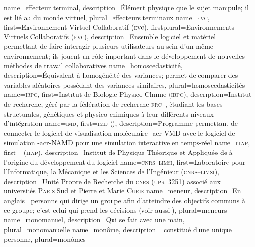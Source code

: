 %
{%
	name={effecteur terminal},%
	description={Élément physique que le sujet manipule; il est lié au  du monde virtuel},%
	plural={effecteurs terminaux}%
}
%
{%
	name={\textsc{evc}},%
	first={Environnement Virtuel Collaboratif (\textsc{evc})},%
	firstplural={Environnements Virtuels Collaboratifs (\textsc{evc})},%
	description={Ensemble logiciel et matériel permettant de faire interagir plusieurs utilisateurs au sein d'un même environnement; ils jouent un rôle important dans le développement de nouvelles méthodes de travail collaboratives}%
}
%
{%
	name={homoscedasticité},%
	description={Équivalent à homogénéité des variances; permet de comparer des variables aléatoires possédant des variances similaires},%
	plural={homoscedasticités}%
}
%
{%
	name={\textsc{ibpc}},%
	first={Institut de Biologie Physico-Chimie (\textsc{ibpc})},%
	description={Institut de recherche, géré par la fédération de recherche \textsc{frc}~, étudiant les bases structurales, génétiques et physico-chimiques à leur différents niveaux d'intégration}%
}
%
{%
	name={\textsc{imd}},%
	first={\textsc{imd} ()},%
	description={Programme permettant de connecter le logiciel de visualisation moléculaire \myacro-{acr-VMD} avec le logiciel de simulation \myacro-{acr-NAMD} pour une simulation interactive en temps-réel }%
}
%
{%
	name={\textsc{itap}},%
	first={ (\textsc{itap})},%
	description={Institut de Physique Théorique et Appliquée de  à l'origine du développement du logiciel }%
}
%
{%
	name={\textsc{cnrs--limsi}},%
	first={Laboratoire pour l'Informatique, la Mécanique et les Sciences de l'Ingénieur (\textsc{cnrs--limsi})},%
	description={Unité Propre de Recherche du \textsc{cnrs} (\textsc{upr}~3251) associé aux universités \textsc{Paris} Sud et Pierre et Marie \textsc{Curie}}%
}
%
{%
	name={meneur},%
	description={En anglais , personne qui dirige un groupe afin d'atteindre des objectifs communs à ce groupe; c'est celui qui prend les décisions (voir aussi )},%
	plural={meneurs}%
}
%
{%
	name={monomanuel},%
	description={Qui se fait avec une main},%
	plural={monomanuelle}%
}
%
{%
	name={monôme},%
	description={ constitué d'une unique personne},%
	plural={monômes}%
}

